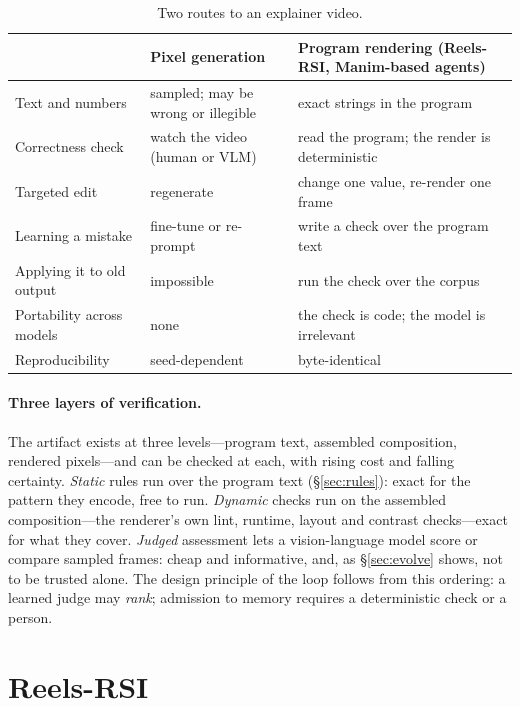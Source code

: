 \documentclass[11pt]{article}
\newcommand{\sys}{Reels-RSI}
\begin{document}
\begin{table}[t]
\centering\small
\begin{tabular}{p{2.9cm}p{5.1cm}p{6.3cm}}
\toprule
& Pixel generation & Program rendering (\sys{}, Manim-based agents) \\
\midrule
Text and numbers & sampled; may be wrong or illegible & exact strings in the program \\
Correctness check & watch the video (human or VLM) & read the program; the render is deterministic \\
Targeted edit & regenerate & change one value, re-render one frame \\
Learning a mistake & fine-tune or re-prompt & write a check over the program text \\
Applying it to old output & impossible & run the check over the corpus \\
Portability across models & none & the check is code; the model is irrelevant \\
Reproducibility & seed-dependent & byte-identical \\
\bottomrule
\end{tabular}
\caption{Two routes to an explainer video.}
\label{tab:modality}
\end{table}

\paragraph{Three layers of verification.} The artifact exists at three levels---program text,
assembled composition, rendered pixels---and can be checked at each, with rising cost and falling
certainty. \emph{Static} rules run over the program text (\S\ref{sec:rules}): exact for the pattern
they encode, free to run. \emph{Dynamic} checks run on the assembled composition---the renderer's own
lint, runtime, layout and contrast checks---exact for what they cover. \emph{Judged} assessment lets
a vision-language model score or compare sampled frames: cheap and informative, and, as
\S\ref{sec:evolve} shows, not to be trusted alone. The design principle of the loop follows from
this ordering: a learned judge may \emph{rank}; admission to memory requires a deterministic
check or a person.

\section{\sys{}}
\label{sec:system}
\end{document}
